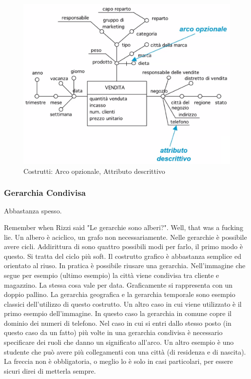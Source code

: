 \begin{figure}[H]
	\begin{center}
		\includegraphics[width=0.7\linewidth]{img/optdesc.png}
		\caption{Costrutti: Arco opzionale, Attributo descrittivo}
	\end{center}
\end{figure}

\subsubsection{Gerarchia Condivisa}
\begin{info}
	Abbastanza spesso.
\end{info}
Remember when Rizzi said "Le gerarchie sono alberi?". Well, that was a fucking lie.\newline
Un albero è aciclico, un grafo non necessariamente. Nelle gerarchie è possibile avere cicli. Addirittura di sono quattro possibili modi per farlo, il primo modo è questo. Si tratta del ciclo più soft. Il costrutto grafico è abbastanza semplice ed orientato al riuso. In pratica è possibile riusare una gerarchia. Nell'immagine che segue per esempio (ultimo esempio) la città viene condivisa tra cliente e magazzino. La stessa cosa vale per data. Graficamente si rappresenta con un doppio pallino. La gerarchia geografica e la gerarchia temporale sono esempio classici dell'utilizzo di questo costrutto.\newline\newline
Un altro caso in cui viene utilizzato è il primo esempio dell'immagine. In questo caso la gerarchia in comune copre il dominio dei numeri di telefono. Nel caso in cui si entri dallo stesso posto (in questo caso da un fatto) più volte in una gerarchia condivisa è necessario specificare dei ruoli che danno un significato all'arco. Un altro esempio è uno studente che può avere più collegamenti con una città (di residenza e di nascita).\newline
La freccia non è obbligatoria, o meglio lo è solo in casi particolari, per essere sicuri direi di metterla sempre.\newline

